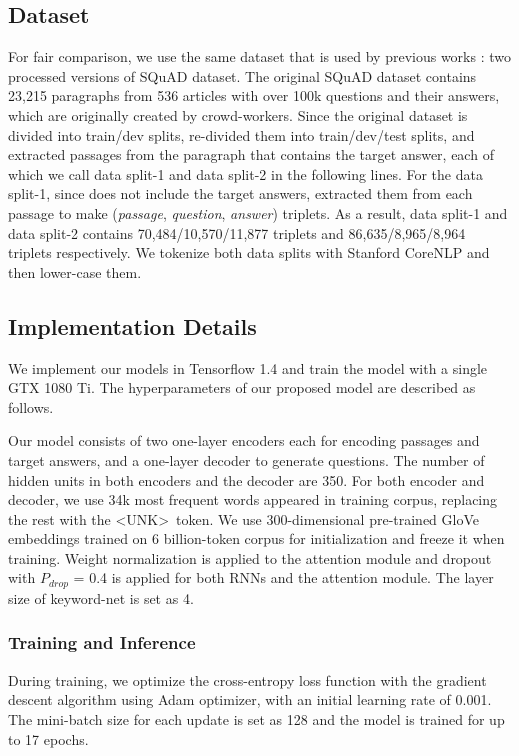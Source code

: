 \documentclass[letterpaper]{article} %
\begin{document}
\subsection{Dataset}
For fair comparison, we use the same dataset that is used by previous works \cite{du2017learning,zhou2017neural,song2018leveraging}: two processed versions of SQuAD\cite{rajpurkar2016squad} dataset. The original SQuAD dataset contains 23,215 paragraphs from 536 articles with over 100k questions and their answers, which are originally created by crowd-workers. Since the original dataset is divided into train/dev splits, \cite{du2017learning,zhou2017neural} re-divided them into train/dev/test splits, and extracted passages from the paragraph that contains the target answer, each of which we call data split-1 and data split-2 in the following lines.  For the data split-1, since \cite{du2017learning} does not include the target answers, \cite{song2018leveraging} extracted them from each passage to make (\textit{passage}, \textit{question}, \textit{answer}) triplets. As a result, data split-1 and data split-2 contains 70,484/10,570/11,877 triplets and 86,635/8,965/8,964 triplets respectively. We tokenize both data splits with Stanford CoreNLP \cite{manning2014stanford} and then lower-case them.




\subsection{Implementation Details}
We implement our models in Tensorflow 1.4 and train the model with a single GTX 1080 Ti. The hyperparameters of our proposed model are described as follows.

Our model consists of two one-layer encoders each for encoding passages and target answers, and a one-layer decoder to generate questions. The number of hidden units in both encoders and the decoder are 350. For both encoder and decoder, we use 34k most frequent words appeared in training corpus, replacing the rest with the \textless UNK\textgreater\ token. We use 300-dimensional pre-trained GloVe \cite{pennington2014glove} embeddings trained on 6 billion-token corpus for initialization and freeze it when training. Weight normalization is applied to the attention module and dropout with \(P_{drop}\) = 0.4 is applied for both RNNs and the attention module. The layer size of keyword-net is set as 4.

\subsubsection{Training and Inference}
During training, we optimize the cross-entropy loss function with the gradient descent algorithm using Adam \cite{kingma2014adam} optimizer, with an initial learning rate of 0.001. The mini-batch size for each update is set as 128 and the model is trained for up to 17 epochs.
\end{document}
